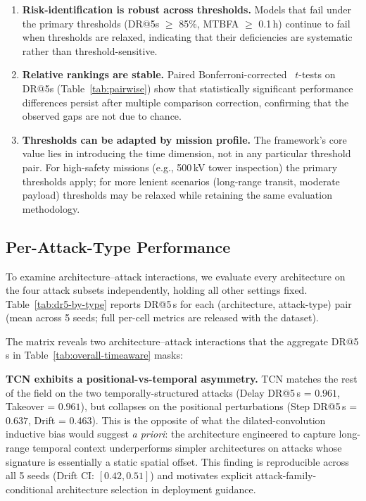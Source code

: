 \documentclass{ieeeaccess}
\begin{document}
\begin{enumerate}
\item \textbf{Risk-identification is robust across thresholds.}
Models that fail under the primary thresholds (DR@5s $\ge$ 85\%, MTBFA $\ge$ 0.1\,h)
continue to fail when thresholds are relaxed, indicating that their deficiencies are
systematic rather than threshold-sensitive.

\item \textbf{Relative rankings are stable.}
Paired Bonferroni-corrected~\cite{ref45} $t$-tests on DR@5s (Table~\ref{tab:pairwise})
show that statistically significant performance differences persist after multiple
comparison correction, confirming that the observed gaps are not due to chance.

\item \textbf{Thresholds can be adapted by mission profile.}
The framework's core value lies in introducing the time dimension, not in any
particular threshold pair.
For high-safety missions (e.g., 500\,kV tower inspection) the primary thresholds
apply; for more lenient scenarios (long-range transit, moderate payload) thresholds
may be relaxed while retaining the same evaluation methodology.
\end{enumerate}

\subsection{Per-Attack-Type Performance}
\label{sec:per-attack}

To examine architecture--attack interactions, we evaluate every architecture
on the four attack subsets independently, holding all other settings fixed.
Table~\ref{tab:dr5-by-type} reports DR@5\,s for each (architecture, attack-type)
pair (mean across 5 seeds; full per-cell metrics are released with the dataset).

\begin{table}[!t]
\caption{DR@5\,s by attack type for all seven detectors (mean over 5 seeds).
Bold cells highlight detector--attack failure modes invisible when DR@5\,s
is averaged across attack types.}
\label{tab:dr5-by-type}
\centering

\end{table}

The matrix reveals two architecture--attack interactions that the aggregate
DR@5\,s in Table~\ref{tab:overall-timeaware} masks:

\textbf{TCN exhibits a positional-vs-temporal asymmetry.}
TCN matches the rest of the field on the two temporally-structured attacks
(Delay DR@5\,s = $0.961$, Takeover = $0.961$), but collapses on the
positional perturbations (Step DR@5\,s = $0.637$, Drift = $0.463$).
This is the opposite of what the dilated-convolution inductive bias would
suggest \emph{a priori}: the architecture engineered to capture long-range
temporal context underperforms simpler architectures on attacks whose
signature is essentially a static spatial offset.
This finding is reproducible across all 5 seeds (Drift CI: $[0.42, 0.51]$)
and motivates explicit attack-family-conditional architecture selection
in deployment guidance.
\end{document}
